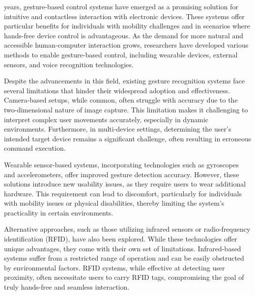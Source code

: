 % 
% 
% 
 years, gesture-based control systems have emerged as a promising solution for intuitive and contactless interaction with electronic devices. These systems offer particular benefits for individuals with mobility challenges and in scenarios where hands-free device control is advantageous. As the demand for more natural and accessible human-computer interaction grows, researchers have developed various methods to enable gesture-based control, including wearable devices, external sensors, and voice recognition technologies.

Despite the advancements in this field, existing gesture recognition systems face several limitations that hinder their widespread adoption and effectiveness. Camera-based setups, while common, often struggle with accuracy due to the two-dimensional nature of image capture. This limitation makes it challenging to interpret complex user movements accurately, especially in dynamic environments. Furthermore, in multi-device settings, determining the user's intended target device remains a significant challenge, often resulting in erroneous command execution.

Wearable sensor-based systems, incorporating technologies such as gyroscopes and accelerometers, offer improved gesture detection accuracy. However, these solutions introduce new usability issues, as they require users to wear additional hardware. This requirement can lead to discomfort, particularly for individuals with mobility issues or physical disabilities, thereby limiting the system's practicality in certain environments.

Alternative approaches, such as those utilizing infrared sensors or radio-frequency identification (RFID), have also been explored. While these technologies offer unique advantages, they come with their own set of limitations. Infrared-based systems suffer from a restricted range of operation and can be easily obstructed by environmental factors. RFID systems, while effective at detecting user proximity, often necessitate users to carry RFID tags, compromising the goal of truly hands-free and seamless interaction.

